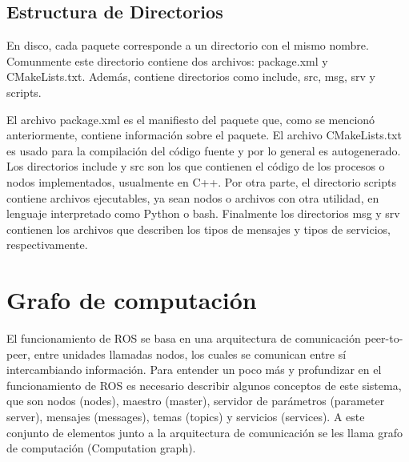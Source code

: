 \subsection{Estructura de Directorios}

En disco, cada paquete corresponde a un directorio con el mismo nombre. Comunmente este directorio contiene dos archivos: package.xml y CMakeLists.txt. Además, contiene directorios como include, src, msg, srv y scripts.

El archivo package.xml es el manifiesto del paquete que, como se mencionó anteriormente, contiene información sobre el paquete. El archivo CMakeLists.txt es usado para la compilación del código fuente y por lo general es autogenerado. Los directorios include y src son los que contienen el código de los procesos o nodos implementados, usualmente en C++. Por otra parte, el directorio scripts contiene archivos ejecutables, ya sean nodos o archivos con otra utilidad, en lenguaje interpretado como Python o bash. Finalmente los directorios msg y srv contienen los archivos que describen los tipos de mensajes y tipos de servicios, respectivamente.

\section{Grafo de computación}

El funcionamiento de ROS se basa en una arquitectura de comunicación peer-to-peer, entre unidades llamadas nodos,  los cuales se comunican entre sí intercambiando información. Para entender un poco más y profundizar en el funcionamiento de ROS es necesario describir algunos conceptos de este sistema, que son nodos (nodes), maestro (master), servidor de parámetros (parameter server), mensajes (messages), temas (topics) y servicios (services). A este conjunto de elementos junto a la arquitectura de comunicación se les llama grafo de computación  (Computation graph).


